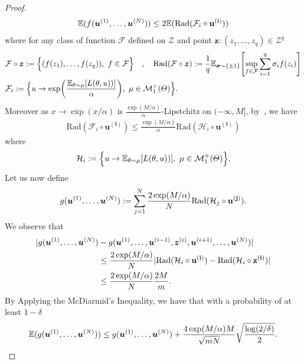 \begin{proof}
\begin{align*}
\mathbb{E}(f(\bm{u}^{(1)},\dots,\bm{u}^{(N)}))\leq 2 \mathbb{E}(\text{Rad}(\mathcal{F}_i\circ \mathbf{u^{(i)}}))    
\end{align*}
where for any class of function $\mathcal{F}$ defined on $\mathcal{Z}$  and point $\bm{z}:(z_1,\dots,z_q)\in\mathcal{Z}^q$
\begin{align*}
    &\mathcal{F}\circ \bm{z}:=\Big\{(f(z_1),\dots,f(z_q)),~f\in\mathcal{F}\Big\} \quad,\quad \text{Rad}(\mathcal{F}\circ \bm{z}):=\frac{1}{q}\mathbb{E}_{\bm{\sigma}\sim\{\pm 1\}}\left[\sup_{f\in\mathcal{F}}\sum_{i=1}^q\sigma_if(z_i)\right]\\
    &\mathcal{F}_i:=\Big\{u\rightarrow\exp\left(\frac{\mathbb{E}_{\theta \sim \mu}\left[\loss(\theta,u))\right]}{\alpha}\right),~\mu\in\mathcal{M}_{1}^{+}(\Theta) \Big\}.
      \end{align*}
Moreover as $x\rightarrow\exp(x/\alpha)$ is $\frac{\exp(M/\alpha)}{\alpha}$-Lipstchitz on $(-\infty,M]$, by~\citep[Lemma 26.9]{shalev2014understanding}, we have 
\begin{align*}
   \text{Rad}(\mathcal{F}_i\circ \mathbf{u^{(i)}})\leq \frac{\exp(M/\alpha)}{\alpha} \text{Rad}(\mathcal{H}_i\circ \mathbf{u^{(i)}}) 
\end{align*}
where 
\begin{align*}
    \mathcal{H}_i:=\Big\{u\rightarrow \mathbb{E}_{\theta \sim \mu}\left[\loss(\theta,u))\right],~\mu\in\mathcal{M}_{1}^{+}(\Theta) \Big\}.
\end{align*}
Let us now define
\begin{align*}
    g(\bm{u}^{(1)},\dots,\bm{u}^{(N)}):=\sum_{j=1}^N\frac{2\exp(M/\alpha)}{N}\text{Rad}(\mathcal{H}_j\circ \mathbf{u^{(j)}}).
\end{align*}
We observe that 
\begin{align*}
|g(\bm{u}^{(1)},\dots,\bm{u}^{(N)}) &- g(\bm{u}^{(1)},\dots,\bm{u}^{(i-1)},\bm{z}^{(i)},\bm{u}^{(i+1)},\dots,\bm{u}^{(N)})|\\
&\leq \frac{2\exp(M/\alpha)}{N}|\text{Rad}(\mathcal{H}_i\circ \mathbf{u^{(i)}}) - \text{Rad}(\mathcal{H}_i\circ \mathbf{z^{(i)}})|\\
&\leq \frac{2\exp(M/\alpha)}{N}\frac{2M}{m}.
\end{align*}
By Applying the McDiarmid’s Inequality, we have that with a probability of at least $1-\delta$
\begin{align*}
\mathbb{E}(g(\bm{u}^{(1)},\dots,\bm{u}^{(\numsamples)}))\leq g(\bm{u}^{(1)},\dots,\bm{u}^{(\numsamples)}) +\frac{4\exp(M/\alpha)M}{\sqrt{m\numsamples}}\sqrt{\frac{\log(2/\delta)}{2}}.

\end{align*}
\end{proof}
